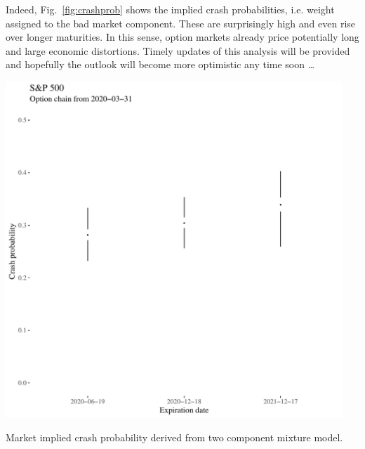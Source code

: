\documentclass[a4paper]{tufte-handout}
\newcommand{\fig}[1]{Fig.~\ref{fig:#1}}
\begin{document}
Indeed, \fig{crashprob} shows the implied crash probabilities,
i.e. weight assigned to the bad market component. These are
surprisingly high and even rise over longer maturities. In this sense,
option markets already price potentially long and large economic
distortions. Timely updates of this analysis will be provided and
hopefully the outlook will become more optimistic any time soon \ldots
\begin{marginfigure}
  \begin{center}
    \includegraphics[width=0.95\textwidth]{../figs/crash_prob.pdf}
  \end{center}
  \caption{\label{fig:crashprob} Market implied crash probability
    derived from two component mixture model.}
\end{marginfigure}

\appendix

\end{document}
